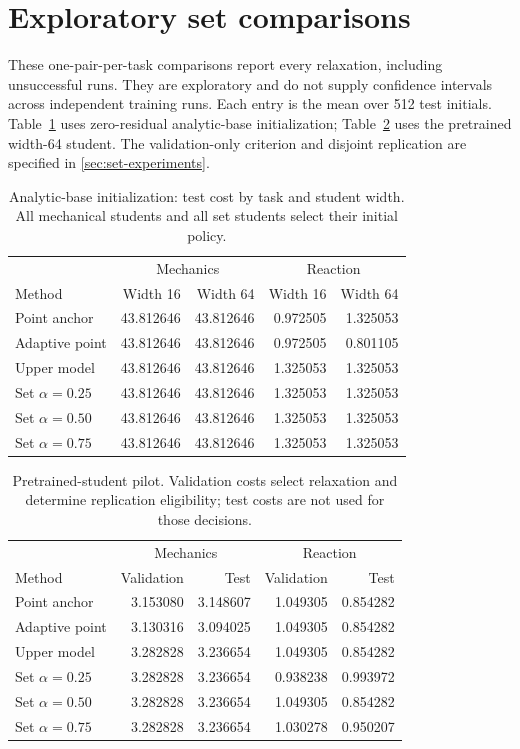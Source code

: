 \section{Exploratory set comparisons}\label{app:set-pilots}
These one-pair-per-task comparisons report every relaxation, including unsuccessful runs. They are exploratory and do not supply confidence intervals across independent training runs. Each entry is the mean over 512 test initials. Table~\ref{tab:set-base} uses zero-residual analytic-base initialization; Table~\ref{tab:set-warm} uses the pretrained width-64 student. The validation-only criterion and disjoint replication are specified in \ref{sec:set-experiments}.
\begin{table}[htbp]\centering\small
\caption{Analytic-base initialization: test cost by task and student width. All mechanical students and all set students select their initial policy.}\label{tab:set-base}
\begin{tabular}{lrrrr}\toprule
 & \multicolumn{2}{c}{Mechanics} & \multicolumn{2}{c}{Reaction} \\
Method & Width 16 & Width 64 & Width 16 & Width 64 \\ \midrule
Point anchor & 43.812646 & 43.812646 & 0.972505 & 1.325053 \\
Adaptive point & 43.812646 & 43.812646 & 0.972505 & 0.801105 \\
Upper model & 43.812646 & 43.812646 & 1.325053 & 1.325053 \\
Set $\alpha=0.25$ & 43.812646 & 43.812646 & 1.325053 & 1.325053 \\
Set $\alpha=0.50$ & 43.812646 & 43.812646 & 1.325053 & 1.325053 \\
Set $\alpha=0.75$ & 43.812646 & 43.812646 & 1.325053 & 1.325053 \\
\bottomrule\end{tabular}\end{table}
\begin{table}[htbp]\centering\small
\caption{Pretrained-student pilot. Validation costs select relaxation and determine replication eligibility; test costs are not used for those decisions.}\label{tab:set-warm}
\begin{tabular}{lrrrr}\toprule
 & \multicolumn{2}{c}{Mechanics} & \multicolumn{2}{c}{Reaction} \\
Method & Validation & Test & Validation & Test \\ \midrule
Point anchor & 3.153080 & 3.148607 & 1.049305 & 0.854282 \\
Adaptive point & 3.130316 & 3.094025 & 1.049305 & 0.854282 \\
Upper model & 3.282828 & 3.236654 & 1.049305 & 0.854282 \\
Set $\alpha=0.25$ & 3.282828 & 3.236654 & 0.938238 & 0.993972 \\
Set $\alpha=0.50$ & 3.282828 & 3.236654 & 1.049305 & 0.854282 \\
Set $\alpha=0.75$ & 3.282828 & 3.236654 & 1.030278 & 0.950207 \\
\bottomrule\end{tabular}\end{table}
